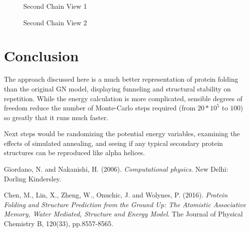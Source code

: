 \documentclass{article}
\begin{document}
	 \begin{figure}[h]
	   \begin{floatrow}
	     {\caption{Second Chain View 1}
	   \label{fig:x2}}
	   {\caption{Second Chain View 2}
	   \label{fig:y2}}
	   \end{floatrow}
	 \end{figure}
	

\section{Conclusion}
	The approach discussed here is a much better representation of protein folding than the original GN model, displaying funneling and structural stability on repetition. While the energy calculation is more complicated, sensible degrees of freedom reduce the number of Monte-Carlo steps required (from $20*10^5$ to $100$) so greatly that it runs much faster.

	Next steps would be randomizing the potential energy variables, examining the effects of simulated annealing, and seeing if any typical secondary protein structures can be reproduced like alpha helices.


\begin{thebibliography}{9}

  Giordano, N. and Nakanishi, H. (2006). \textit{Computational physics}. New Delhi: Dorling Kindersley.

  Chen, M., Lin, X., Zheng, W., Onuchic, J. and Wolynes, P. (2016). \textit{Protein Folding and Structure Prediction from the Ground Up: The Atomistic Associative Memory, Water Mediated, Structure and Energy Model}. The Journal of Physical Chemistry B, 120(33), pp.8557-8565.
\end{thebibliography}
\end{document}
